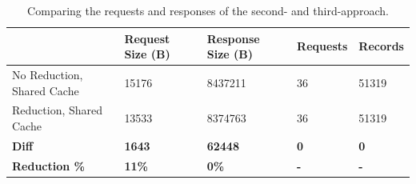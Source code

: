 \documentclass[MSE,Master,english]{twbook}%
\begin{document}
\ifshowTables
\begin{table}[H]
    \begin{tabular}{|l|l|l|l|l|}
    \hline
      & Request Size (B) & Response Size (B) & Requests & Records \\
    \hline
     No Reduction, Shared Cache & 15176 &  8437211 & 36 & 51319 \\
     \hline
     Reduction, Shared Cache &  13533 &  8374763 & 36 & 51319 \\
     \hline
     \hline
     \textbf{Diff} & \textbf{1643} & \textbf{62448} & \textbf{0} & \textbf{0} \\
     \hline
     \textbf{Reduction \%} & \textbf{11\%} & \textbf{0\%} & \textbf{-} & \textbf{-} \\
     \hline
    \end{tabular}
    \caption{Comparing the requests and responses of the second- and third-approach.}
    \label{table:results:size-comparison-first-path-cache-no-reduction-cache-reduction}
\end{table}
\fi

\ifshowUnusedContent


\end{document}
